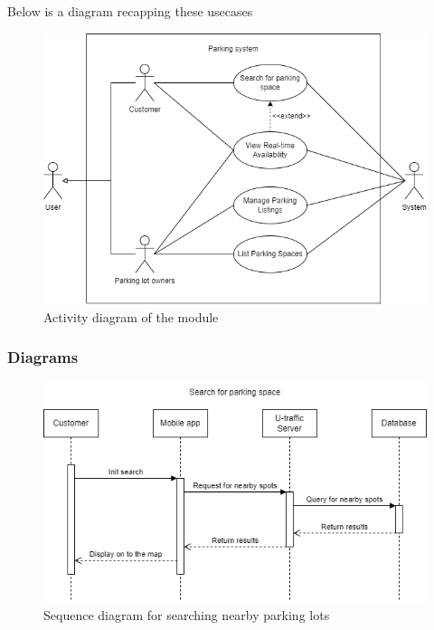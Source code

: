 Below is a diagram recapping these usecases

\begin{figure}[H]
    \centering
    \includegraphics[width=0.8\linewidth]{assets/images/Implementation/Parking/Parking Use case updated.drawio.png}
    \caption{Activity diagram of the module}
    \label{fig:parking_usecase}
\end{figure}

\subsubsection{Diagrams}


\begin{figure}[H]
    \centering
    \includegraphics[width=\linewidth]{assets/images/Implementation/Parking/Search_lot_sequence.png}
    \caption{Sequence diagram for searching nearby parking lots}
    \label{fig:parking_search}
\end{figure}

